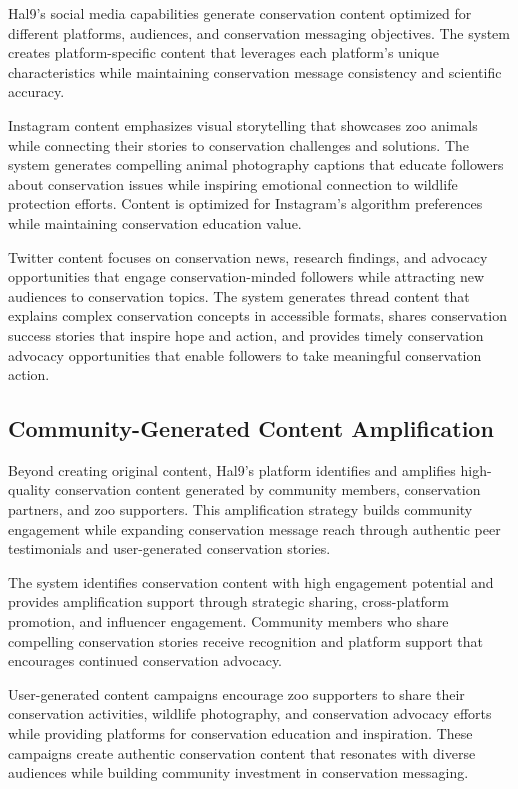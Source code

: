 \documentclass[
  Letterpaper,
]{scrbook}
\begin{document}
Hal9's social media capabilities generate conservation content optimized
for different platforms, audiences, and conservation messaging
objectives. The system creates platform-specific content that leverages
each platform's unique characteristics while maintaining conservation
message consistency and scientific accuracy.

Instagram content emphasizes visual storytelling that showcases zoo
animals while connecting their stories to conservation challenges and
solutions. The system generates compelling animal photography captions
that educate followers about conservation issues while inspiring
emotional connection to wildlife protection efforts. Content is
optimized for Instagram's algorithm preferences while maintaining
conservation education value.

Twitter content focuses on conservation news, research findings, and
advocacy opportunities that engage conservation-minded followers while
attracting new audiences to conservation topics. The system generates
thread content that explains complex conservation concepts in accessible
formats, shares conservation success stories that inspire hope and
action, and provides timely conservation advocacy opportunities that
enable followers to take meaningful conservation action.

\subsection{Community-Generated Content
Amplification}\label{community-generated-content-amplification}

Beyond creating original content, Hal9's platform identifies and
amplifies high-quality conservation content generated by community
members, conservation partners, and zoo supporters. This amplification
strategy builds community engagement while expanding conservation
message reach through authentic peer testimonials and user-generated
conservation stories.

The system identifies conservation content with high engagement
potential and provides amplification support through strategic sharing,
cross-platform promotion, and influencer engagement. Community members
who share compelling conservation stories receive recognition and
platform support that encourages continued conservation advocacy.

User-generated content campaigns encourage zoo supporters to share their
conservation activities, wildlife photography, and conservation advocacy
efforts while providing platforms for conservation education and
inspiration. These campaigns create authentic conservation content that
resonates with diverse audiences while building community investment in
conservation messaging.
\end{document}
